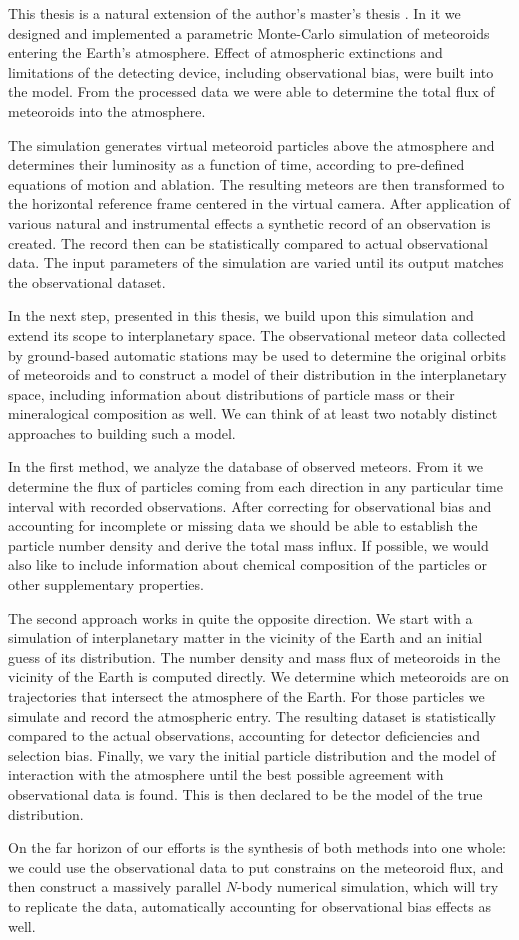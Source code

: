 This thesis is a natural extension of the author's master's thesis \citep{balaz-thesis}.
In it we designed and implemented a parametric Monte-Carlo simulation of meteoroids entering the Earth's atmosphere.
Effect of atmospheric extinctions and limitations of the detecting device, including observational bias, were built into the model.
From the processed data we were able to determine the total flux of meteoroids into the atmosphere.

The simulation generates virtual meteoroid particles above the atmosphere and determines their
luminosity as a function of time, according to pre-defined equations of motion and ablation.
The resulting meteors are then transformed to the horizontal reference frame centered in the virtual camera.
After application of various natural and instrumental effects a synthetic record of an observation is created.
The record then can be statistically compared to actual observational data.
The input parameters of the simulation are varied until its output matches the observational dataset.

In the next step, presented in this thesis, we build upon this simulation and extend its scope to interplanetary space.
The observational meteor data collected by ground-based automatic stations may be used
to determine the original orbits of meteoroids and to construct a model
of their distribution in the interplanetary space, including information
about distributions of particle mass or their mineralogical composition as well.
We can think of at least two notably distinct approaches to building such a model.

In the first method, we analyze the database of observed meteors. From it we determine
the flux of particles coming from each direction in any particular time interval with recorded observations.
After correcting for observational bias and accounting for incomplete or missing
data we should be able to establish the particle number density and derive the total mass influx.
If possible, we would also like to include information
about chemical composition of the particles or other supplementary properties.

The second approach works in quite the opposite direction. We start with a simulation
of interplanetary matter in the vicinity of the Earth and an initial guess of its distribution.
The number density and mass flux of meteoroids in the vicinity of the Earth is computed directly.
We determine which meteoroids are on trajectories that intersect the atmosphere of the Earth.
For those particles we simulate and record the atmospheric entry. The resulting dataset is statistically compared
to the actual observations, accounting for detector deficiencies and selection bias.
Finally, we vary the initial particle distribution and the model of interaction with the atmosphere
until the best possible agreement with observational data is found.
This is then declared to be the model of the true distribution.

On the far horizon of our efforts is the synthesis of both methods into one whole:
we could use the observational data to put constrains on the meteoroid flux,
and then construct a massively parallel $N$-body numerical simulation,
which will try to replicate the data, automatically accounting for observational bias effects as well.
